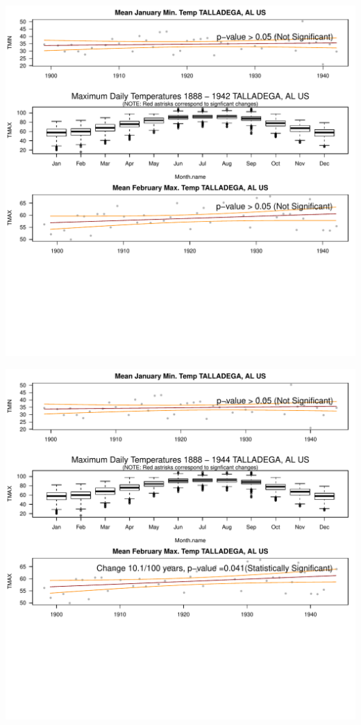 \documentclass{article}\usepackage[]{graphicx}\usepackage[]{color}
\makeatletter
\def\maxwidth{ %
  \ifdim\Gin@nat@width>\linewidth
    \linewidth
  \else
    \Gin@nat@width
  \fi
}
\newenvironment{knitrout}{}{} %
\makeatother
\begin{document}
\begin{knitrout}
\includegraphics[width=\maxwidth]{figure/static_template-17} 

\includegraphics[width=\maxwidth]{figure/static_template-18} 


\end{knitrout}
\end{document}

